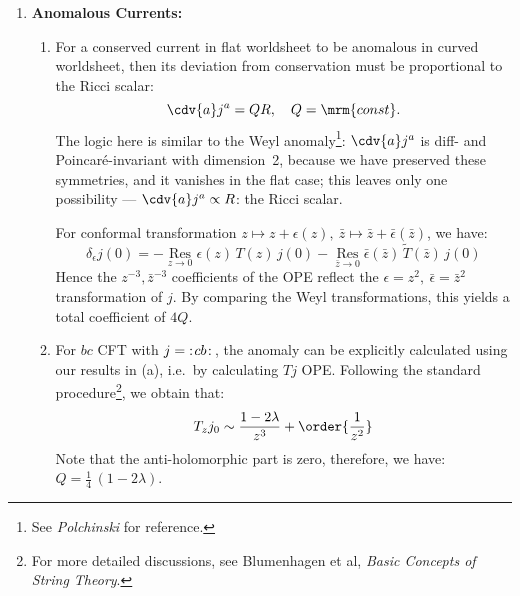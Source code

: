 \documentclass[a4paper,10pt]{article}
\begin{document}
\begin{enumerate}
	\item \textbf{Anomalous Currents:}
	
	\begin{enumerate}
	\item For a conserved current in flat worldsheet to be anomalous in curved worldsheet, then its deviation from conservation must be proportional to the Ricci scalar:
	\begin{equation}
		\cdv{a} j^a = QR,\quad
		Q = \mrm{const}. 
	\end{equation}
	The logic here is similar to the Weyl anomaly\footnote{
		See \textit{Polchinski} for reference. 
	}: $\cdv{a} j^a$ is diff- and Poincaré-invariant with dimension~2, because we have preserved these symmetries, and it vanishes in the ﬂat case; this leaves only one possibility --- $
		\cdv{a} j^a \propto R
	$: the Ricci scalar. 
	
	For conformal transformation $
		z\mapsto z + \epsilon(z),\ %
		\bar{z}\mapsto \bar{z}
			+ \bar{\epsilon}(\bar{z})
	$, we have:
	\begin{equation}
		\delta_\epsilon j(0)
		= -\operatorname*{Res}\limits_{z\to 0}
				\epsilon(z)\,
				T(z)\,j(0)
			-\operatorname*{Res}\limits_{\bar{z}\to 0}
				\bar{\epsilon}(\bar{z})\,
				\tilde{T}(\bar{z})\,j(0)
	\end{equation}
	Hence the $z^{-3},\bar{z}^{-3}$ coefficients of the OPE reflect the $
		\epsilon = z^2,\ %
		\bar{\epsilon} = \bar{z}^2
	$ transformation of $j$.  By comparing the Weyl transformations, this yields a total coefficient of $4Q$. 
	
	\item For $bc$ CFT with $j = {\mathopen {:}}{{\hskip .1em} cb{\hskip .1em}}{\mathclose {:}}\,$, the anomaly can be explicitly calculated using our results in (a), i.e.\ by calculating $Tj$ OPE. Following the standard procedure\footnote{
		For more detailed discussions, see Blumenhagen et al, \textit{Basic Concepts of String Theory}. 
	}, we obtain that:
	\begin{equation}
		T_z j_0 \sim \frac{1 - 2\lambda}{z^3}
			+ \order{\frac{1}{z^2}}
	\end{equation}
	Note that the anti-holomorphic part is zero, therefore, we have: $
		Q = \frac{1}{4}\,(1 - 2\lambda)
	$. \qedfull
	
	\end{enumerate}
	
	\end{enumerate}


\printbibliography[%
	,heading = bibintoc
]
\end{document}
